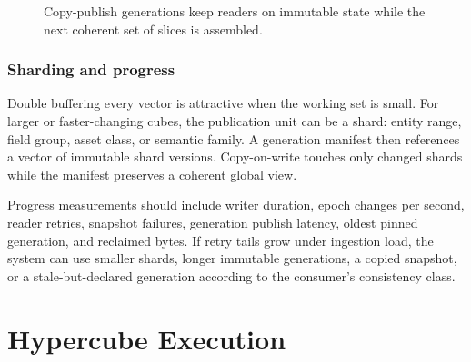 \documentclass{strategynet-journal}
\begin{document}
\begin{figure}[ht]
\centering
{}
\caption{Copy-publish generations keep readers on immutable state while the
next coherent set of slices is assembled.}
\label{fig:generation}
\end{figure}

\section{Sharding and progress}

Double buffering every vector is attractive when the working set is small.
For larger or faster-changing cubes, the publication unit can be a shard:
entity range, field group, asset class, or semantic family.  A generation
manifest then references a vector of immutable shard versions.  Copy-on-write
touches only changed shards while the manifest preserves a coherent global
view.

Progress measurements should include
writer duration, epoch changes per second, reader retries, snapshot failures,
generation publish latency, oldest pinned generation, and reclaimed bytes.
If retry tails grow under ingestion load, the system can use smaller shards,
longer immutable generations, a
copied snapshot, or a stale-but-declared generation according to the
consumer's consistency class.

\clearpage
\part{Hypercube Execution}
\end{document}
